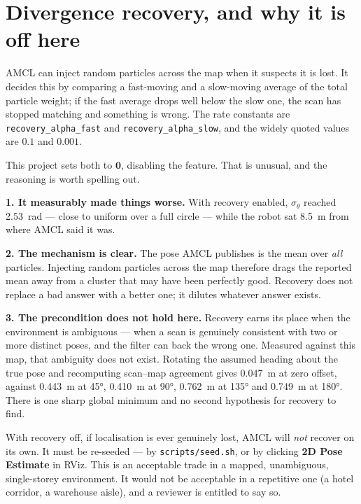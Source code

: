 \documentclass[11pt,a4paper]{report}
\newcommand{\file}[1]{\texttt{\small #1}}
\begin{document}
\section{Divergence recovery, and why it is off here}

AMCL can inject random particles across the map when it suspects it is lost.
It decides this by comparing a fast-moving and a slow-moving average of the
total particle weight; if the fast average drops well below the slow one, the
scan has stopped matching and something is wrong. The rate constants are
\file{recovery\_alpha\_fast} and \file{recovery\_alpha\_slow}, and the widely
quoted values are $0.1$ and $0.001$.

This project sets both to $\mathbf{0}$, disabling the feature. That is
unusual, and the reasoning is worth spelling out.

\begin{plain}
\textbf{1. It measurably made things worse.} With recovery enabled,
$\sigma_\theta$ reached \SI{2.53}{\radian} --- close to uniform over a full
circle --- while the robot sat \SI{8.5}{\metre} from where AMCL said it was.

\textbf{2. The mechanism is clear.} The pose AMCL publishes is the mean over
\emph{all} particles. Injecting random particles across the map therefore drags
the reported mean away from a cluster that may have been perfectly good.
Recovery does not replace a bad answer with a better one; it dilutes whatever
answer exists.

\textbf{3. The precondition does not hold here.} Recovery earns its place when
the environment is ambiguous --- when a scan is genuinely consistent with two
or more distinct poses, and the filter can back the wrong one. Measured
against this map, that ambiguity does not exist. Rotating the assumed heading
about the true pose and recomputing scan--map agreement gives
\SI{0.047}{\metre} at zero offset, against \SI{0.443}{\metre} at \ang{+45},
\SI{0.410}{\metre} at \ang{+90}, \SI{0.762}{\metre} at \ang{+135} and
\SI{0.749}{\metre} at \ang{180}. There is one sharp global minimum and no
second hypothesis for recovery to find.
\end{plain}

\begin{warnbox}
With recovery off, if localisation is ever genuinely lost, AMCL will
\emph{not} recover on its own. It must be re-seeded --- by
\file{scripts/seed.sh}, or by clicking \textbf{2D Pose Estimate} in RViz. This
is an acceptable trade in a mapped, unambiguous, single-storey environment. It
would not be acceptable in a repetitive one (a hotel corridor, a warehouse
aisle), and a reviewer is entitled to say so.
\end{warnbox}
\end{document}
